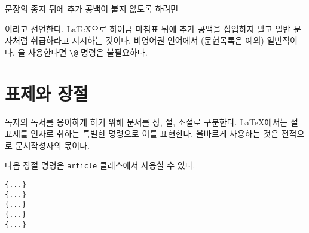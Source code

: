 문장의 종지 뒤에 추가 공백이 붙지 않도록 하려면
\begin{lscommand}
\end{lscommand}
\noindent 이라고 선언한다. \LaTeX 으로 하여금 마침표 뒤에 추가 공백을 삽입하지 말고
일반 문자처럼 취급하라고 지시하는 것이다.
비영어권 언어에서 (문헌목록은 예외) 일반적이다. 을 사용한다면 
\verb|\@| 명령은 불필요하다.

\section{표제와 장절}

독자의 독서를 용이하게 하기 위해 문서를 장, 절, 소절로 구분한다.
\LaTeX 에서는 절 표제를 인자로 취하는 특별한 명령으로 이를 표현한다.
올바르게 사용하는 것은 전적으로 문서작성자의 몫이다.

다음 장절 명령은 \texttt{article} 클래스에서 사용할 수 있다.

\begin{lscommand}
\verb|{...}|\\
\verb|{...}|\\
\verb|{...}|\\
\verb|{...}|\\
\verb|{...}|
\end{lscommand}

